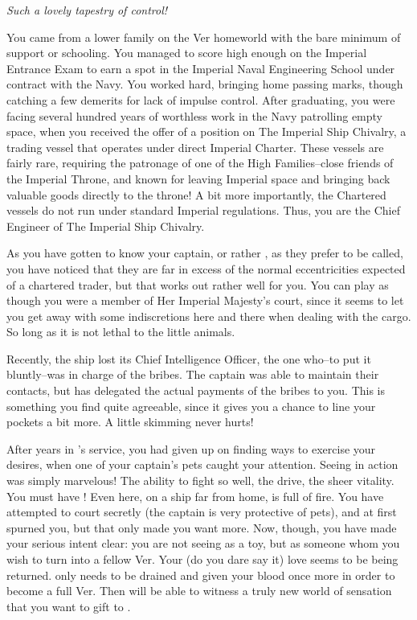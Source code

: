 \documentclass[char]{guildcamp4}
\begin{document}
\name{\cVtwo{}}

\textit{Such a lovely tapestry of control!}

You came from a lower family on the Ver homeworld with the bare minimum of support or schooling. You managed to score high enough on the Imperial Entrance Exam to earn a spot in the Imperial Naval Engineering School under contract with the Navy. You worked hard, bringing home passing marks, though catching a few demerits for lack of impulse control. After graduating, you were facing several hundred years of worthless work in the Navy patrolling empty space, when you received the offer of a position on The Imperial Ship Chivalry, a trading vessel that operates under direct Imperial Charter. These vessels are fairly rare, requiring the patronage of one of the High Families--close friends of the Imperial Throne, and known for leaving Imperial space and bringing back valuable goods directly to the throne! A bit more importantly, the Chartered vessels do not run under standard Imperial regulations. Thus, you are the Chief Engineer of The Imperial Ship Chivalry. 

As you have gotten to know your captain, or rather \cVone{\Duke}, as they prefer to be called, you have noticed that they are far in excess of the normal eccentricities expected of a chartered trader, but that works out rather well for you. You can play as though you were a member of Her Imperial Majesty's court, since it seems to let you get away with some indiscretions here and there when dealing with the cargo. So long as it is not lethal to the little animals. 

Recently, the ship lost its Chief Intelligence Officer, the one who--to put it bluntly--was in charge of the bribes. The captain was able to maintain their contacts, but has delegated the actual payments of the bribes to you. This is something you find quite agreeable, since it gives you a chance to line your pockets a bit more. A little skimming never hurts!

After years in \cVone{}'s service, you had given up on finding ways to exercise your desires, when one of your captain's pets caught your attention. Seeing \cJulie{} in action was simply marvelous! The ability to fight so well, the drive, the sheer vitality. You must have \cJulie{\them}! Even here, on a ship far from home, \cJulie{\they} is full of fire. You have attempted to court \cJulie{\them} secretly (the captain is very protective of \cVone{\their} pets), and at first \cJulie{\they} spurned you, but that only made you want \cJulie{\them} more. Now, though, you have made your serious intent clear: you are not seeing \cJulie{\them} as a toy, but as someone whom you wish to turn into a fellow Ver. Your (do you dare say it) love seems to be being returned. \cJulie{} only needs to be drained and given your blood once more in order to become a full Ver. Then \cJulie{\they} will be able to witness a truly new world of sensation that you want to gift to \cJulie{\them}.
\end{document}
